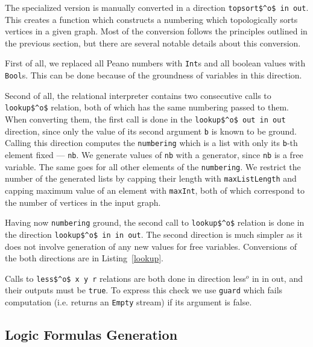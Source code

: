



The specialized version is manually converted in a direction \lstinline{topsort$^o$ in out}.
This creates a function which constructs a numbering which topologically sorts vertices in a given graph.
Most of the conversion follows the principles outlined in the previous section, but there are several notable details about this conversion.

First of all, we replaced all Peano numbers with \lstinline{Int}s and all \mk boolean values with \lstinline{Bool}s.
This can be done because of the groundness of variables in this direction.

Second of all, the relational interpreter contains two consecutive calls to \lstinline{lookup$^o$} relation, both of which has the same numbering passed to them.
When converting them, the first call is done in the \lstinline{lookup$^o$ out in out} direction, since only the value of its second argument \lstinline{b} is known to be ground.
Calling this direction computes the \lstinline{numbering} which is a list with only its \lstinline{b}-th element fixed --- \lstinline{nb}.
We generate values of \lstinline{nb} with a generator, since \lstinline{nb} is a free variable.
The same goes for all other elements of the \lstinline{numbering}.
We restrict the number of the generated lists by capping their length with \lstinline{maxListLength} and capping maximum value of an element with \lstinline{maxInt}, both of which correspond to the number of vertices in the input graph.

Having now \lstinline{numbering} ground, the second call to \lstinline{lookup$^o$} relation is done in the direction \lstinline{lookup$^o$ in in out}.
The second direction is much simpler as it does not involve generation of any new values for free variables.
Conversions of the both directions are in Listing~\ref{lookup}.

Calls to \lstinline{less$^o$ x y r} relations are both done in direction {less$^o$ in in out}, and their outputs must be \lstinline{true}.
To express this check we use \lstinline{guard} which fails computation (i.e. returns an \lstinline{Empty} stream) if its argument is false.









\subsection{Logic Formulas Generation}

